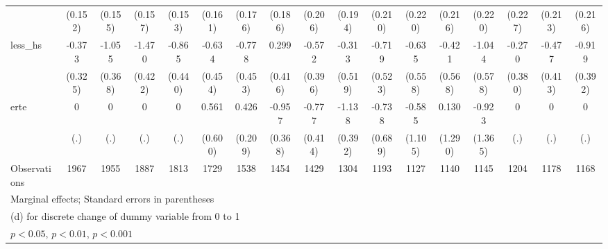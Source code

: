 {\begin{tabular}{l*{16}{c}}
                    &     (0.152)         &     (0.155)         &     (0.157)         &     (0.153)         &     (0.161)         &     (0.176)         &     (0.186)         &     (0.206)         &     (0.194)         &     (0.210)         &     (0.220)         &     (0.216)         &     (0.220)         &     (0.227)         &     (0.213)         &     (0.216)         \\
[1em]
less\_hs             &      -0.373         &      -1.055\sym{**} &      -1.470\sym{***}&      -0.865\sym{*}  &      -0.634         &      -0.778         &       0.299         &      -0.572         &      -0.313         &      -0.719         &      -0.635         &      -0.421         &      -1.044         &      -0.270         &      -0.477         &      -0.919\sym{*}  \\
                    &     (0.325)         &     (0.368)         &     (0.422)         &     (0.440)         &     (0.454)         &     (0.453)         &     (0.416)         &     (0.396)         &     (0.519)         &     (0.523)         &     (0.558)         &     (0.568)         &     (0.578)         &     (0.380)         &     (0.413)         &     (0.392)         \\
[1em]
erte                &           0         &           0         &           0         &           0         &       0.561         &       0.426\sym{*}  &      -0.957\sym{**} &      -0.777         &      -1.138\sym{**} &      -0.738         &      -0.585         &       0.130         &      -0.923         &           0         &           0         &           0         \\
                    &         (.)         &         (.)         &         (.)         &         (.)         &     (0.600)         &     (0.209)         &     (0.368)         &     (0.414)         &     (0.392)         &     (0.689)         &     (1.105)         &     (1.290)         &     (1.365)         &         (.)         &         (.)         &         (.)         \\
\hline
Observations        &        1967         &        1955         &        1887         &        1813         &        1729         &        1538         &        1454         &        1429         &        1304         &        1193         &        1127         &        1140         &        1145         &        1204         &        1178         &        1168         \\
\hline\hline
\multicolumn{17}{l}{\footnotesize Marginal effects; Standard errors in parentheses}\\
\multicolumn{17}{l}{\footnotesize  (d) for discrete change of dummy variable from 0 to 1}\\
\multicolumn{17}{l}{\footnotesize \sym{*} \(p<0.05\), \sym{**} \(p<0.01\), \sym{***} \(p<0.001\)}\\
\end{tabular}
}
